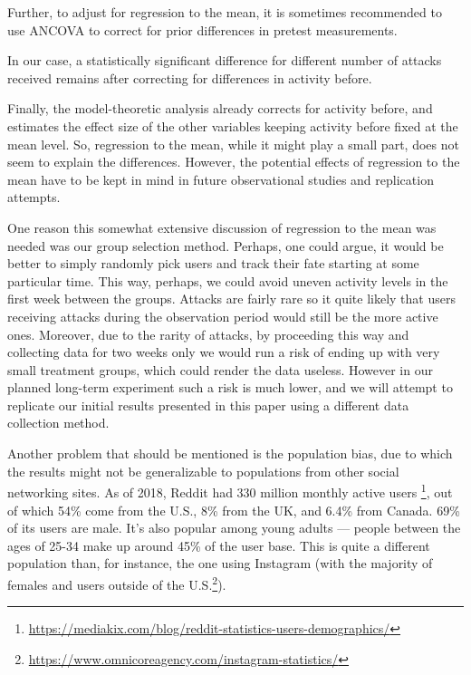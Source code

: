 \documentclass[10pt,dvipsnames]{scrartcl}
\begin{document}
\begin{table}[H]
\footnotesize
{}
\normalsize 
\caption{Results of ANCOVA test of activity difference vs. activity before and the number of narrow attacks received.}
\end{table}

Further, to adjust for regression to the mean, it is sometimes
recommended to use ANCOVA to correct for prior differences in pretest
measurements.

\noindent In our case, a statistically significant difference for
different number of attacks received remains after correcting for
differences in activity before.

Finally, the model-theoretic analysis already corrects for activity
before, and estimates the effect size of the other variables keeping
activity before fixed at the mean level. So, regression to the mean,
while it might play a small part, does not seem to explain the
differences. However, the potential effects of regression to the mean
have to be kept in mind in future observational studies and replication
attempts.

One reason this somewhat extensive discussion of regression to the mean
was needed was our group selection method. Perhaps, one could argue, it
would be better to simply randomly pick users and track their fate
starting at some particular time. This way, perhaps, we could avoid
uneven activity levels in the first week between the groups. Attacks are
fairly rare so it quite likely that users receiving attacks during the
observation period would still be the more active ones. Moreover, due to
the rarity of attacks, by proceeding this way and collecting data for
two weeks only we would run a risk of ending up with very small
treatment groups, which could render the data useless. However in our
planned long-term experiment such a risk is much lower, and we will
attempt to replicate our initial results presented in this paper using a
different data collection method.

Another problem that should be mentioned is the population bias, due to
which the results might not be generalizable to populations from other
social networking sites. As of 2018, Reddit had 330 million monthly
active users
\footnote{\url{https://mediakix.com/blog/reddit-statistics-users-demographics/}},
out of which 54\% come from the U.S., 8\% from the UK, and 6.4\% from
Canada. 69\% of its users are male. It's also popular among young adults
--- people between the ages of 25-34 make up around 45\% of the user
base. This is quite a different population than, for instance, the one
using Instagram (with the majority of females and users outside of the
U.S.\footnote{\url{https://www.omnicoreagency.com/instagram-statistics/}}).
\end{document}
